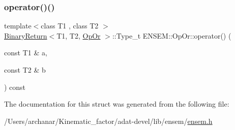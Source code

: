 \subsubsection{\texorpdfstring{operator()()}{operator()()}\hspace{0.1cm}{\footnotesize\ttfamily [3/3]}}
{\footnotesize\ttfamily template$<$class T1 , class T2 $>$ \\
\mbox{\hyperlink{structENSEM_1_1BinaryReturn}{Binary\+Return}}$<$T1, T2, \mbox{\hyperlink{structENSEM_1_1OpOr}{Op\+Or}} $>$\+::Type\+\_\+t E\+N\+S\+E\+M\+::\+Op\+Or\+::operator() (\begin{DoxyParamCaption}\item[{const T1 \&}]{a,  }\item[{const T2 \&}]{b }\end{DoxyParamCaption}) const\hspace{0.3cm}{\ttfamily [inline]}}



The documentation for this struct was generated from the following file\+:\begin{DoxyCompactItemize}
\item 
/\+Users/archanar/\+Kinematic\+\_\+factor/adat-\/devel/lib/ensem/\mbox{\hyperlink{adat-devel_2lib_2ensem_2ensem_8h}{ensem.\+h}}\end{DoxyCompactItemize}
